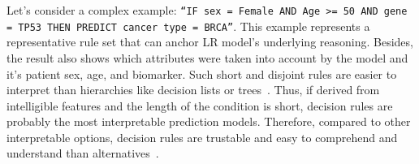 \hspace*{3.5mm} Let's consider a complex example: \texttt{``IF sex = Female AND Age >= 50 AND gene = TP53 THEN PREDICT cancer type = BRCA''}. This example represents a representative rule set that can anchor LR model's underlying reasoning. Besides, the result also shows which attributes were taken into account by the model and it's patient sex, age, and biomarker. Such short and disjoint rules are easier to interpret than hierarchies like decision lists or trees~\cite{ming2018rulematrix}.
Thus, if derived from intelligible features and the length of the condition is short, decision rules are probably the most interpretable prediction models. Therefore, compared to other interpretable options, decision rules are trustable and easy to comprehend and understand than alternatives~\cite{ribeiro2018anchors}. 

